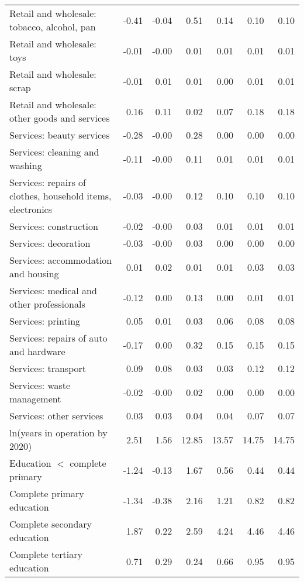 \begin{longtable}{lrrrrrr}
  Retail and wholesale: tobacco, alcohol, pan & -0.41 & -0.04 & 0.51 & 0.14 & 0.10 & 0.10 \\ 
  Retail and wholesale: toys & -0.01 & -0.00 & 0.01 & 0.01 & 0.01 & 0.01 \\ 
  Retail and wholesale: scrap & -0.01 & 0.01 & 0.01 & 0.00 & 0.01 & 0.01 \\ 
  Retail and wholesale: other goods and services & 0.16 & 0.11 & 0.02 & 0.07 & 0.18 & 0.18 \\ 
  Services: beauty services & -0.28 & -0.00 & 0.28 & 0.00 & 0.00 & 0.00 \\ 
  Services: cleaning and washing & -0.11 & -0.00 & 0.11 & 0.01 & 0.01 & 0.01 \\ 
  Services: repairs of clothes, household items, electronics & -0.03 & -0.00 & 0.12 & 0.10 & 0.10 & 0.10 \\ 
  Services: construction & -0.02 & -0.00 & 0.03 & 0.01 & 0.01 & 0.01 \\ 
  Services: decoration & -0.03 & -0.00 & 0.03 & 0.00 & 0.00 & 0.00 \\ 
  Services: accommodation and housing & 0.01 & 0.02 & 0.01 & 0.01 & 0.03 & 0.03 \\ 
  Services: medical and other professionals & -0.12 & 0.00 & 0.13 & 0.00 & 0.01 & 0.01 \\ 
  Services: printing & 0.05 & 0.01 & 0.03 & 0.06 & 0.08 & 0.08 \\ 
  Services: repairs of auto and hardware & -0.17 & 0.00 & 0.32 & 0.15 & 0.15 & 0.15 \\ 
  Services: transport & 0.09 & 0.08 & 0.03 & 0.03 & 0.12 & 0.12 \\ 
  Services: waste management & -0.02 & -0.00 & 0.02 & 0.00 & 0.00 & 0.00 \\ 
  Services: other services & 0.03 & 0.03 & 0.04 & 0.04 & 0.07 & 0.07 \\ 
  ln(years in operation by 2020) & 2.51 & 1.56 & 12.85 & 13.57 & 14.75 & 14.75 \\ 
  Education $<$ complete primary & -1.24 & -0.13 & 1.67 & 0.56 & 0.44 & 0.44 \\ 
  Complete primary education & -1.34 & -0.38 & 2.16 & 1.21 & 0.82 & 0.82 \\ 
  Complete secondary education & 1.87 & 0.22 & 2.59 & 4.24 & 4.46 & 4.46 \\ 
  Complete tertiary education & 0.71 & 0.29 & 0.24 & 0.66 & 0.95 & 0.95 \\ 
   \hline
\hline
\end{longtable}
